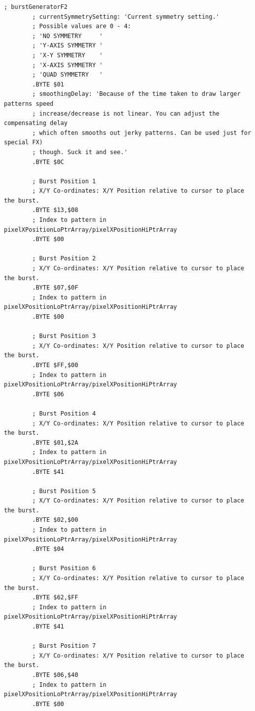 \begin{lstlisting}[basicstyle=\tiny,caption=Source code for the F2 Burst.]
; burstGeneratorF2
        ; currentSymmetrySetting: 'Current symmetry setting.'
        ; Possible values are 0 - 4:
        ; 'NO SYMMETRY     '
        ; 'Y-AXIS SYMMETRY '
        ; 'X-Y SYMMETRY    '
        ; 'X-AXIS SYMMETRY '
        ; 'QUAD SYMMETRY   '
        .BYTE $01
        ; smoothingDelay: 'Because of the time taken to draw larger patterns speed
        ; increase/decrease is not linear. You can adjust the compensating delay
        ; which often smooths out jerky patterns. Can be used just for special FX)
        ; though. Suck it and see.'
        .BYTE $0C

        ; Burst Position 1
        ; X/Y Co-ordinates: X/Y Position relative to cursor to place the burst.
        .BYTE $13,$08
        ; Index to pattern in pixelXPositionLoPtrArray/pixelXPositionHiPtrArray
        .BYTE $00

        ; Burst Position 2
        ; X/Y Co-ordinates: X/Y Position relative to cursor to place the burst.
        .BYTE $07,$0F
        ; Index to pattern in pixelXPositionLoPtrArray/pixelXPositionHiPtrArray
        .BYTE $00

        ; Burst Position 3
        ; X/Y Co-ordinates: X/Y Position relative to cursor to place the burst.
        .BYTE $FF,$00
        ; Index to pattern in pixelXPositionLoPtrArray/pixelXPositionHiPtrArray
        .BYTE $06

        ; Burst Position 4
        ; X/Y Co-ordinates: X/Y Position relative to cursor to place the burst.
        .BYTE $01,$2A
        ; Index to pattern in pixelXPositionLoPtrArray/pixelXPositionHiPtrArray
        .BYTE $41

        ; Burst Position 5
        ; X/Y Co-ordinates: X/Y Position relative to cursor to place the burst.
        .BYTE $02,$00
        ; Index to pattern in pixelXPositionLoPtrArray/pixelXPositionHiPtrArray
        .BYTE $04

        ; Burst Position 6
        ; X/Y Co-ordinates: X/Y Position relative to cursor to place the burst.
        .BYTE $62,$FF
        ; Index to pattern in pixelXPositionLoPtrArray/pixelXPositionHiPtrArray
        .BYTE $41

        ; Burst Position 7
        ; X/Y Co-ordinates: X/Y Position relative to cursor to place the burst.
        .BYTE $06,$40
        ; Index to pattern in pixelXPositionLoPtrArray/pixelXPositionHiPtrArray
        .BYTE $00


\end{lstlisting}
